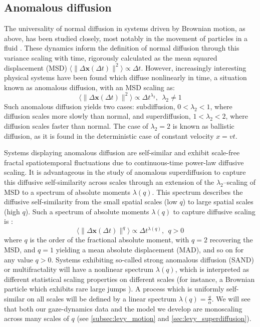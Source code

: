 \subsection{Anomalous diffusion}\label{subsec:anom_diff}
The universality of normal diffusion in systems driven by Brownian motion, as above, has been studied closely, most notably in the movement of particles in a fluid \cite{Einstein1905, klafter_anomalous_2005, metzler_anomalous_2014, Merritt2007a}. These dynamics inform the definition of normal diffusion through this variance scaling with time, rigorously calculated as the mean squared displacement (MSD) $\langle \|\Delta \textbf{x} (\Delta t) \|^2 \rangle \propto 
\Delta t$. However, increasingly interesting physical systems have been found which diffuse nonlinearly in time, a situation known as anomalous diffusion, with an MSD scaling as:
\begin{equation}
    \langle \| \Delta \textbf{x} (\Delta t) \|^{2} \rangle \propto \Delta t^{\lambda_2}, \ \ \lambda_2 \neq 1
\end{equation}
Such anomalous diffusion yields two cases: subdiffusion, $0 < \lambda_2 < 1$, where diffusion scales more slowly than normal, and superdiffusion, $1 < \lambda_2 < 2$, where diffusion scales faster than normal. The case of $\lambda_2 = 2$ is known as ballistic diffusion, as it is found in the deterministic case of constant velocity $x = vt$. 

Systems displaying anomalous diffusion are self-similar and exhibit scale-free fractal spatiotemporal fluctuations due to continuous-time power-law diffusive scaling. It is advantageous in the study of anomalous superdiffusion to capture this diffusive self-similarity across scales through an extension of the $\lambda_2$--scaling of MSD to a spectrum of absolute moments $\lambda(q)$. This spectrum describes the diffusive self-similarity from the small spatial scales (low $q$) to large spatial scales (high $q$). Such a spectrum of absolute moments $\lambda(q)$ to capture diffusive scaling is \cite{vilk_strong_2025}:
\begin{equation}\label{eq:MFD}
	\langle \| \Delta \textbf{x}(\Delta t) \| ^ q \rangle \propto \Delta t^{\lambda(q)}, \ \ q > 0
\end{equation}
where $q$ is the order of the fractional absolute moment, with $q=2$ recovering the MSD, and $q=1$ yielding a mean absolute displacement (MAD), and so on for any value $q>0$. Systems exhibiting so-called strong anomalous diffusion (SAND) or multifractality will have a nonlinear spectrum $\lambda(q)$, which is interpreted as different statistical scaling properties on different scales (for instance, a Brownian particle which exhibits rare large jumps \cite{wang_strong_2020}). A process which is uniformly self-similar on all scales will be defined by a linear spectrum $\lambda(q) = \frac{q}{\alpha}$. We will see that both our gaze-dynamics data and the model we develop are monoscaling across many scales of $q$ (see \cref{subsec:levy_motion} and \cref{sec:levy_superdiffusion}).

